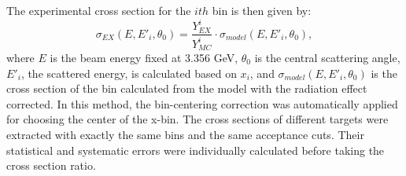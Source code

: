 	The experimental cross section for the $ith$ bin is then given by:
	\begin{equation}
	\sigma_{EX}(E, E'_{i},\theta_{0}) = \frac{Y^{i}_{EX}}{Y^{i}_{MC}}\cdot\sigma_{model}(E, E'_{i},\theta_{0}),
	\end{equation}
	where $E$ is the beam energy fixed at 3.356 GeV, $\theta_{0}$ is the central scattering angle, $E'_{i}$, the scattered energy, is calculated based on $x_{i}$, and $\sigma_{model}(E, E'_{i},\theta_{0})$ is the cross section of the bin calculated from the model with the radiation effect corrected.  In this method, the bin-centering correction was automatically applied for choosing the center of the x-bin. The cross sections of different targets were extracted with exactly the same bins and the same acceptance cuts. Their statistical and systematic errors were individually calculated before taking the cross section ratio.


